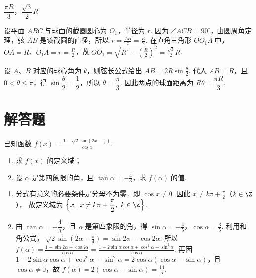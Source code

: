 \begin{answer}
\(\dfrac{\pi R}{3}\)，\(\dfrac{\sqrt{3}}{2}R\)
\end{answer}

\begin{solution}
设平面 \(ABC\) 与球面的截圆圆心为 \(O_1\)，半径为 \(r\). 因为 \(\angle ACB=90^\circ\)，由圆周角定理，弦 \(AB\) 是该截圆的直径，所以 \(r=\frac{AB}{2}=\frac R2\). 在直角三角形 \(OO_1A\) 中，\(OA=R\)、\(O_1A=r=\frac{R}{2}\)，故 \(OO_1=\sqrt{R^2-\left(\frac R2\right)^2}=\frac{\sqrt3}{2}R\).

设 \(A\)、\(B\) 对应的球心角为 \(\theta\)，则弦长公式给出 \(AB=2R\sin\frac\theta2\). 代入 \(AB=R\)，且 \(0<\theta\leqslant\pi\)，得 \(\sin\dfrac\theta2=\dfrac12\)，所以 \(\theta=\dfrac\pi3\). 因此两点的球面距离为 \(R\theta=\dfrac{\pi R}{3}\).
\end{solution}

\section{解答题}
\begin{problem}
已知函数 \(f(x)=\frac{1-\sqrt{2}\sin\left(2x-\frac{\pi}{4}\right)}{\cos x}\).

\begin{enumerate}
\item 求 \(f(x)\) 的定义域；
\item 设 \(\alpha\) 是第四象限的角，且 \(\tan\alpha=-\frac{4}{3}\)，求 \(f(\alpha)\) 的值.
\end{enumerate}
\end{problem}

\begin{solution}
\begin{enumerate}
\item 分式有意义的必要条件是分母不为零，即 \(\cos x\ne0\). 因此
\(x\ne k\pi+\frac\pi2\)（\(k\in\Z\)），
故定义域为 \(\left\{x\mid x\ne k\pi+\dfrac\pi2,\ k\in\Z\right\}\).
\item 由 \(\tan\alpha=-\dfrac43\)，且 \(\alpha\) 是第四象限的角，得
\(\sin\alpha=-\frac45\)，\(\cos\alpha=\frac35\).
利用和角公式，
\(\sqrt2\sin\left(2\alpha-\frac\pi4\right)=\sin2\alpha-\cos2\alpha\).
所以
\(f(\alpha)=\frac{1-\sin2\alpha+\cos2\alpha}{\cos\alpha}=\frac{1-2\sin\alpha\cos\alpha+\cos^2\alpha-\sin^2\alpha}{\cos\alpha}\). 再因 \(1-2\sin\alpha\cos\alpha+\cos^2\alpha-\sin^2\alpha=2\cos\alpha(\cos\alpha-\sin\alpha)\)，且 \(\cos\alpha\ne0\)，故 \(f(\alpha)=2(\cos\alpha-\sin\alpha)=\frac{14}{5}\).
\end{enumerate}
\end{solution}

